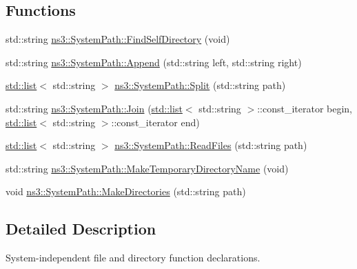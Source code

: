 \subsection*{Functions}
\begin{DoxyCompactItemize}
\item 
std\+::string \hyperlink{group__systempath_gad52e6f153465b40487da3a2a9ee5f5d6}{ns3\+::\+System\+Path\+::\+Find\+Self\+Directory} (void)
\item 
std\+::string \hyperlink{group__systempath_gaaa5a530cee42c8eda7e4f4523ef7e1cd}{ns3\+::\+System\+Path\+::\+Append} (std\+::string left, std\+::string right)
\item 
\hyperlink{openflow-interface_8h_afd9bcfa176617760671b67580f536fa7}{std\+::list}$<$ std\+::string $>$ \hyperlink{group__systempath_ga523072e05da63b63113d1bea840edf1a}{ns3\+::\+System\+Path\+::\+Split} (std\+::string path)
\item 
std\+::string \hyperlink{group__systempath_gab3212957e6b4f873ece3c6b8ed746d72}{ns3\+::\+System\+Path\+::\+Join} (\hyperlink{openflow-interface_8h_afd9bcfa176617760671b67580f536fa7}{std\+::list}$<$ std\+::string $>$\+::const\+\_\+iterator begin, \hyperlink{openflow-interface_8h_afd9bcfa176617760671b67580f536fa7}{std\+::list}$<$ std\+::string $>$\+::const\+\_\+iterator end)
\item 
\hyperlink{openflow-interface_8h_afd9bcfa176617760671b67580f536fa7}{std\+::list}$<$ std\+::string $>$ \hyperlink{group__systempath_ga152a348bccf02d8373607b0239587b87}{ns3\+::\+System\+Path\+::\+Read\+Files} (std\+::string path)
\item 
std\+::string \hyperlink{group__systempath_ga271d7de64c9f6454db57fe21bc51c5d0}{ns3\+::\+System\+Path\+::\+Make\+Temporary\+Directory\+Name} (void)
\item 
void \hyperlink{group__systempath_ga9529f7530ba5d513c8811acc15743d24}{ns3\+::\+System\+Path\+::\+Make\+Directories} (std\+::string path)
\end{DoxyCompactItemize}


\subsection{Detailed Description}
System-\/independent file and directory function declarations. 